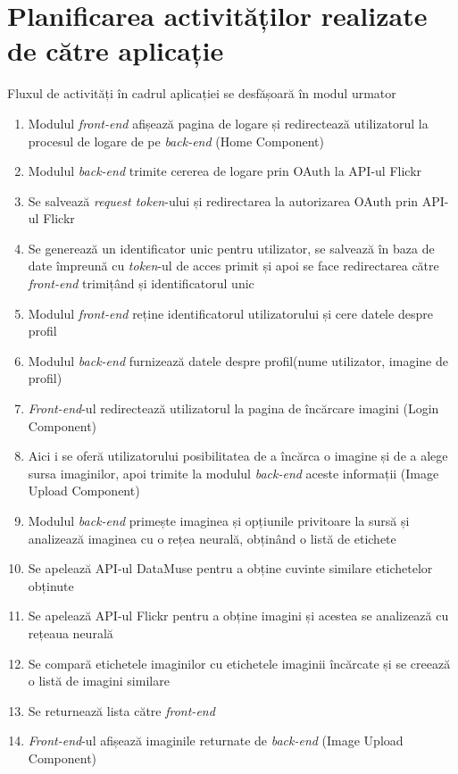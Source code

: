 \section{Planificarea activităților realizate de către aplicație}
Fluxul de activități în cadrul aplicației se desfășoară în modul urmator
\begin{enumerate}
    \item Modulul \textit{front-end} afișează pagina de logare și redirectează utilizatorul la procesul de logare de pe \textit{back-end} (Home Component)
    \item Modulul \textit{back-end} trimite cererea de logare prin OAuth la API-ul Flickr
    \item  Se salvează \textit{request token}-ului și redirectarea la autorizarea OAuth prin API-ul Flickr
    \item  Se generează un identificator unic pentru utilizator, se salvează în baza de date împreună cu \textit{token}-ul de acces primit și apoi se face redirectarea către \textit{front-end} trimițând și identificatorul unic
    \item Modulul \textit{front-end} reține identificatorul utilizatorului și cere  datele despre profil 
    \item Modulul \textit{back-end} furnizează datele despre profil(nume utilizator, imagine de profil)
    \item \textit{Front-end}-ul redirectează utilizatorul la pagina de încărcare imagini (Login Component)
    \item Aici i se oferă utilizatorului posibilitatea de a încărca o imagine și de a alege sursa imaginilor, apoi trimite la modulul \textit{back-end} aceste informații (Image Upload Component)
    \item Modulul \textit{back-end} primește imaginea și opțiunile privitoare la sursă și  analizează imaginea cu o rețea neurală, obținând o listă de etichete
    \item Se apelează API-ul DataMuse pentru a obține cuvinte similare etichetelor obținute
    \item Se apelează API-ul Flickr pentru a obține imagini și acestea se  analizează cu rețeaua neurală
    \item Se compară etichetele imaginilor cu etichetele imaginii încărcate și se creează o listă de imagini similare
    \item Se returnează lista către \textit{front-end}
    \item \textit{Front-end}-ul afișează imaginile returnate de \textit{back-end} (Image Upload Component)
\end{enumerate}{}


